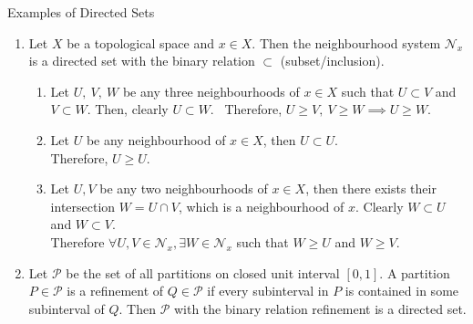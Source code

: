 \begin{remark}
	Examples of Directed Sets
	\begin{enumerate}
		\item Let \( X \) be a topological space and \( x \in X \).
			Then the neighbourhood system \( \mathcal{N}_x \) is a directed set with the binary relation \( \subset \) (subset/inclusion).
		\begin{commentary}
		\begin{enumerate}
			\item Let \( U,\ V,\ W \) be any three neighbourhoods of \( x \in X \) such that \( U \subset V \) and \( V \subset W \).
				Then, clearly \( U \subset W \).
				\ Therefore, \( U \ge V,\ V \ge W \implies U \ge W \).
			\item Let \( U \) be any neighbourhood of \( x \in X \), then \( U \subset U \).\\
				Therefore, \( U \ge U \).
			\item Let \( U,V \) be any two neighbourhoods of \( x \in X \), then there exists their intersection \( W = U\cap V \), which is a neighbourhood of \( x \).
				Clearly \( W \subset U \) and \( W \subset V \).\\
				Therefore \( \forall U,V \in \mathcal{N}_x, \exists W \in \mathcal{N}_x \) such that \( W \ge U \) and \( W \ge V \).
		\end{enumerate}
		\end{commentary}
		\item Let \( \mathcal{P} \) be the set of all partitions on closed unit interval \( [0,1] \).
			A partition \( P \in \mathcal{P} \) is a refinement of \( Q \in \mathcal{P} \) if every subinterval in \( P \) is contained in some subinterval of \( Q \).
			Then \( \mathcal{P} \) with the binary relation refinement is a directed set.


\end{enumerate}
\end{remark}
